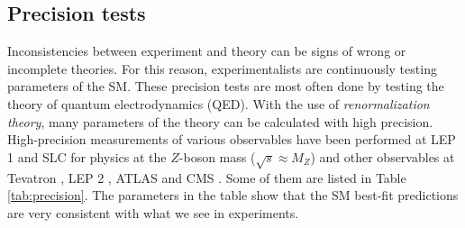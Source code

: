 \subsection{Precision tests}



Inconsistencies between experiment and theory can be signs of wrong or incomplete theories. For this reason, experimentalists are continuously testing parameters of the SM. These precision tests are most often done by testing the theory of quantum electrodynamics (QED). With the use of \textit{renormalization theory}, many parameters of the theory can be calculated with high precision. High-precision measurements of various observables have been performed at LEP 1 and SLC \cite{ALEPH:2005ab,Riemann:2010zz,Abe:2000dq,Abe:2000uc,Abe:2000hk,Abe:1996ef} for physics at the $Z$-boson mass ($\sqrt{s} \approx M_Z$) and other observables at Tevatron \cite{Aaltonen:2013iut,TEW:2010aj}, LEP 2 \cite{TEW:2010aj}, ATLAS \cite{Aaboud:2017svj,ATLASurl1} and CMS \cite{CMSurl1,CMSurl2}. Some of them are listed in Table \ref{tab:precision}. The parameters in the table show that the SM best-fit predictions are very consistent with what we see in experiments.


